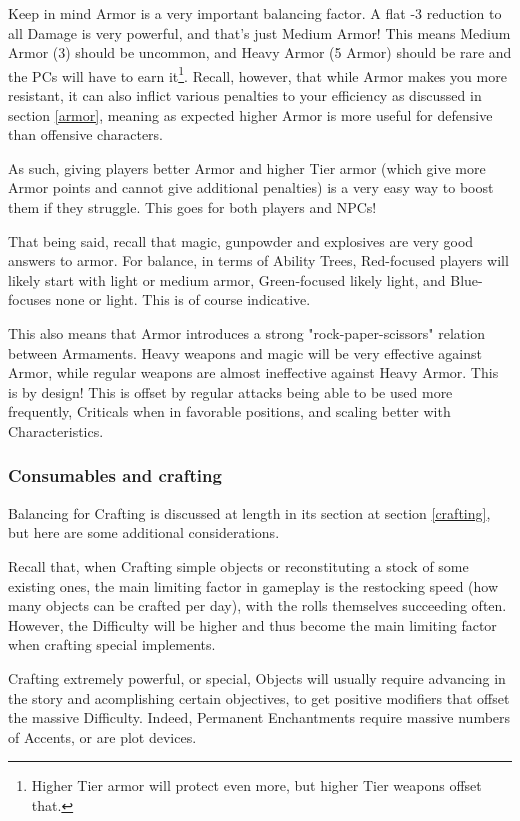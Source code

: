 Keep in mind Armor is a very important balancing factor. A flat -3 reduction to all Damage is very powerful, and that's just Medium Armor! This means Medium Armor (3) should be uncommon, and Heavy Armor (5 Armor) should be rare and the PCs will have to earn it\footnote{Higher Tier armor will protect even more, but higher Tier weapons offset that.}. Recall, however, that while Armor makes you more resistant, it can also inflict various penalties to your efficiency as discussed in section \ref{armor}, meaning as expected higher Armor is more useful for defensive than offensive characters.

As such, giving players better Armor and higher Tier armor (which give more Armor points and cannot give additional penalties) is a very easy way to boost them if they struggle. This goes for both players and NPCs!

That being said, recall that magic, gunpowder and explosives are very good answers to armor. For balance, in terms of Ability Trees, Red-focused players will likely start with light or medium armor, Green-focused likely light, and Blue-focuses none or light. This is of course indicative.

This also means that Armor introduces a strong "rock-paper-scissors" relation between Armaments. Heavy weapons and magic will be very effective against Armor, while regular weapons are almost ineffective against Heavy Armor. This is by design! This is offset by regular attacks being able to be used more frequently, Criticals when in favorable positions, and scaling better with Characteristics.




\subsubsection{Consumables and crafting}

Balancing for Crafting is discussed at length in its section at section \ref{crafting}, but here are some additional considerations.

Recall that, when Crafting simple objects or reconstituting a stock of some existing ones, the main limiting factor in gameplay is the restocking speed (how many objects can be crafted per day), with the rolls themselves succeeding often. However, the Difficulty will be higher and thus become the main limiting factor when crafting special implements.

Crafting extremely powerful, or special, Objects will usually require advancing in the story and acomplishing certain objectives, to get positive modifiers that offset the massive Difficulty. Indeed, Permanent Enchantments require massive numbers of Accents, or are plot devices.


